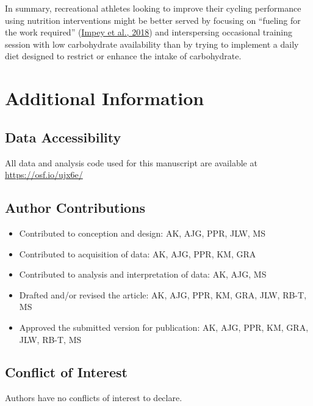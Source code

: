 \documentclass[]{cik}%
\begin{document}
In summary, recreational athletes looking to improve their cycling
performance using nutrition interventions might be better served by
focusing on ``fueling for the work required''
(\protect\hyperlink{ref-67}{Impey et al., 2018}) and interspersing
occasional training session with low carbohydrate availability than by
trying to implement a daily diet designed to restrict or enhance the
intake of carbohydrate.

\hypertarget{additional-information}{%
\section{Additional Information}\label{additional-information}}

\hypertarget{data-accessibility}{%
\subsection{Data Accessibility}\label{data-accessibility}}

All data and analysis code used for this manuscript are available at
\url{https://osf.io/ujx6e/}

\hypertarget{author-contributions}{%
\subsection{Author Contributions}\label{author-contributions}}

\begin{itemize}
\tightlist
\item
  Contributed to conception and design: AK, AJG, PPR, JLW, MS
\item
  Contributed to acquisition of data: AK, AJG, PPR, KM, GRA
\item
  Contributed to analysis and interpretation of data: AK, AJG, MS
\item
  Drafted and/or revised the article: AK, AJG, PPR, KM, GRA, JLW, RB-T,
  MS
\item
  Approved the submitted version for publication: AK, AJG, PPR, KM, GRA,
  JLW, RB-T, MS
\end{itemize}

\hypertarget{conflict-of-interest}{%
\subsection{Conflict of Interest}\label{conflict-of-interest}}

Authors have no conflicts of interest to declare.
\end{document}
